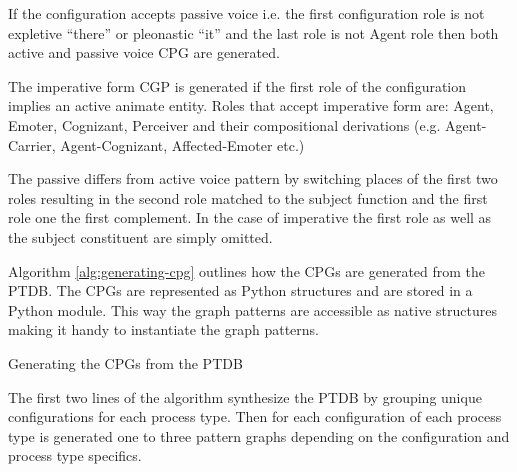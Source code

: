 If the configuration accepts passive voice i.e. the first configuration role is not expletive ``there'' or pleonastic ``it'' and the last role is not Agent role then both active and passive voice CPG are generated.

The imperative form CGP is generated if the first role of the configuration implies an active animate entity. Roles that accept imperative form are: Agent, Emoter, Cognizant, Perceiver and their compositional derivations (e.g. Agent-Carrier, Agent-Cognizant, Affected-Emoter etc.)

The passive differs from active voice pattern by switching places of the first two roles resulting in the second role matched to the subject function and the first role one the first complement. In the case of imperative the first role  as well as the subject constituent are simply omitted.  

Algorithm \ref{alg:generating-cpg} outlines how the CPGs are generated from the PTDB. The CPGs are represented as Python structures and are stored in a Python module. This way the graph patterns are accessible as native structures making it handy to instantiate the graph patterns. 


\begin{algorithm}[H]
	\caption{Generating the CPGs from the PTDB}
	\label{alg:generating-cpg}
\end{algorithm}

The first two lines of the algorithm synthesize the PTDB by grouping unique configurations for each process type. Then for each configuration of each process type is generated one to three pattern graphs depending on the configuration and process type specifics.

